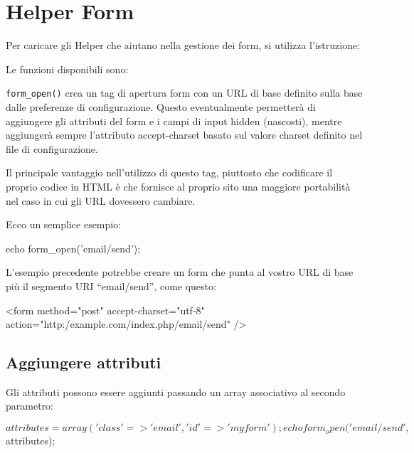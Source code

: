 \section{Helper Form}
\label{helper:form}

Per caricare gli Helper che aiutano nella gestione dei form, si utilizza l'istruzione:


Le funzioni disponibili sono:

\verb|form_open()| crea un tag di apertura form con un \ac{URL} di base definito sulla base dalle preferenze di configurazione. Questo eventualmente permetterà di aggiungere gli attributi del form e i campi di input hidden (nascosti), mentre aggiungerà sempre l'attributo accept-charset basato sul valore charset definito nel file di configurazione.

Il principale vantaggio nell'utilizzo di questo tag, piuttosto che codificare il proprio codice in \ac{HTML} è che fornisce al proprio sito una maggiore portabilità nel caso in cui gli \ac{URL} dovessero cambiare.

Ecco un semplice esempio:

\begin{code}
echo form_open('email/send');
\end{code}

L'esempio precedente potrebbe creare un form che punta al vostro URL di base più il segmento URI ``email/send'', come questo:

\begin{code}
<form method="post" accept-charset="utf-8" action="http:/example.com/index.php/email/send" />
\end{code}

\subsection*{Aggiungere attributi}

Gli attributi possono essere aggiunti passando un array associativo al secondo parametro:

\begin{code}
$attributes = array('class' => 'email', 'id' => 'myform');

echo form_open('email/send', $attributes);
\end{code}

